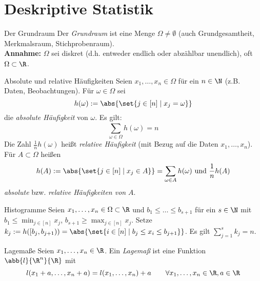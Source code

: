 \section*{Deskriptive Statistik}

\begin{karte}{Der Grundraum}
	Der \textit{Grundraum} ist eine Menge $\Omega \neq \emptyset$ (auch Grundgesamtheit, Merkmalsraum, Stichprobenraum). \\
	\textbf{Annahme:} $\Omega$ sei diskret (d.h. entweder endlich oder abzählbar unendlich), oft $\Omega \subset \R$.
\end{karte}

\begin{karte}{Absolute und relative Häufigkeiten}
	Seien $x_1,\dotsc,x_n \in \Omega$ für ein $n \in \N$ (z.B. Daten, Beobachtungen). Für $\omega \in \Omega$ sei
	$$h(\omega):=\abs{\set{j \in [ n ] \;|\; x_j=\omega }} $$
	die \textit{absolute Häufigkeit} von $\omega$. Es gilt:
	$$\sum_{\omega \in \Omega}^{} h(\omega) = n$$
	Die Zahl $\frac{1}{n}h(\omega)$ heißt \textit{relative Häufigkeit} (mit Bezug auf die Daten $x_1,\dotsc,x_n$). Für $A \subset \Omega$ heißen
	$$h(A):=\abs{\set{j \in [n] \;|\; x_j \in A}} = \sum_{\omega \in A} h(\omega) \text{ und } \frac{1}{n} h(A) $$
	\textit{absolute} bzw. \textit{relative Häufigkeiten von} $A$.
\end{karte}

\begin{karte}{Histogramme}
	Seien $x_1,\dotsc,x_n \in \Omega \subset \R$ und $b_1\le\dotsc\le b_{s+1}$ für ein $s \in \N$ mit $\displaystyle b_1 \leq \min_{j \in [n]} x_j$, $\displaystyle b_{s+1} \ge \max_{j \in [n]} x_j$. Setze $k_j:=h([b_j, b_{j+1})) = \abs{\set{i \in [n] \;|\; b_j \leq x_i \leq b_{j+1}}}$. Es gilt $\displaystyle \sum_{j=1}^{s} k_j = n$.
\end{karte}

\begin{karte}{Lagemaße}
	Seien $x_1,\dotsc,x_n \in \R$. Ein \textit{Lagemaß} ist eine Funktion $\abb{l}{\R^n}{\R}$ mit 
	$$l(x_1+a,\dotsc,x_n+a) = l(x_1,\dotsc,x_n)+a \qquad \forall x_1,\dotsc,x_n \in \R, a \in \R$$
	
\end{karte}

